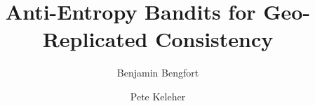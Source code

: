 \documentclass[sigconf]{acmart}
\begin{document}
\title{Anti-Entropy Bandits for Geo-Replicated Consistency}

\author{Benjamin Bengfort}

\author{Pete Keleher}


\begin{abstract}
    
\end{abstract}

\maketitle





\end{document}
